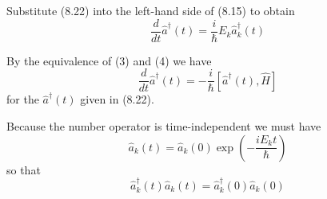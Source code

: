 Substitute (8.22) into the left-hand side of (8.15) to obtain
\begin{equation*}
\frac{d}{dt}\hat a^\dag(t)=\frac{i}{\hbar}E_k\hat a_k^\dag(t)
\tag{4}
\end{equation*}

By the equivalence of (3) and (4) we have
\begin{equation*}
\frac{d}{dt}\hat a^\dag(t)=-\frac{i}{\hbar}\left[\hat a^\dag(t),\hat H\right]
\end{equation*}
for the $\hat a^\dag(t)$ given in (8.22).

\bigskip
Because the number operator is time-independent we must have
\begin{equation*}
\hat a_k(t)=\hat a_k(0)\exp\left(-\frac{iE_kt}{\hbar}\right)
\end{equation*}
so that
\begin{equation*}
\hat a_k^\dag(t)\hat a_k(t)=\hat a_k^\dag(0)\hat a_k(0)
\end{equation*}


